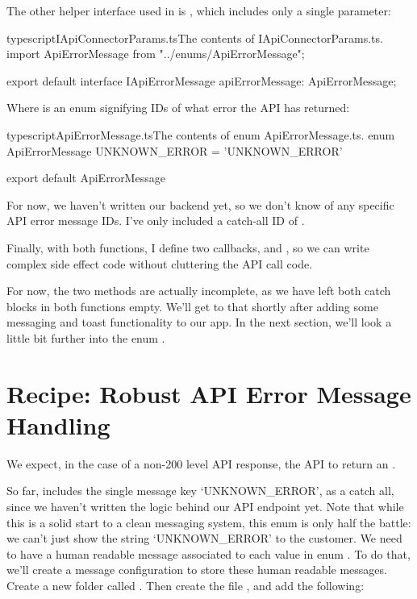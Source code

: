 \documentclass[a4paper,headinclude=on,footinclude=on,12pt,oneside]{scrbook}
\begin{document}
The other helper interface used in  is , which includes only a single parameter:

\begin{codeInput}{typescript}{IApiConnectorParams.ts}{The contents of IApiConnectorParams.ts.}
import ApiErrorMessage from "../enums/ApiErrorMessage";

export default interface IApiErrorMessage {
    apiErrorMessage: ApiErrorMessage;
}
\end{codeInput}

Where  is an enum signifying IDs of what error the API has returned:

\begin{codeInput}{typescript}{ApiErrorMessage.ts}{The contents of enum ApiErrorMessage.ts.}
enum ApiErrorMessage {
    UNKNOWN_ERROR = 'UNKNOWN_ERROR'
}

export default ApiErrorMessage
\end{codeInput}

For now, we haven't written our backend yet, so we don't know of any specific API error message IDs. I've only included a catch-all ID of .

Finally, with both functions, I define two callbacks,  and , so we can write complex side effect code without cluttering the API call code. 

For now, the two methods are actually incomplete, as we have left both catch blocks in both functions empty. We'll get to that shortly after adding some messaging and toast functionality to our app. In the next section, we'll look a little bit further into the enum .

\section{Recipe: Robust API Error Message Handling}

We expect, in the case of a non-200 level API response, the API to return an .

So far,  includes the single message key `UNKNOWN\_ERROR', as a catch all, since we haven't written the logic behind our API endpoint yet. Note that while this is a solid start to a clean messaging system, this enum is only half the battle: we can't just show the string `UNKNOWN\_ERROR' to the customer. We need to have a human readable message associated to each value in enum . To do that, we'll create a message configuration to store these human readable messages. Create a new folder called . Then create the file , and add the following:
\end{document}
